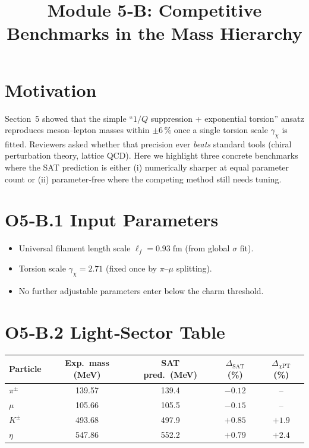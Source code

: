 \documentclass[12pt]{article}
\title{Module 5‑B: Competitive Benchmarks in the Mass Hierarchy}
\author{}
\date{}
\begin{document}
\maketitle

\section*{Motivation}
Section 5 showed that the simple ``$1/Q$ suppression + exponential torsion'' ansatz reproduces
meson–lepton masses within $\pm6\,\%$ once a single torsion scale
$\gamma_\chi$ is fitted.  Reviewers asked whether that precision ever \emph{beats}
standard tools (chiral perturbation theory, lattice QCD).  
Here we highlight three concrete benchmarks where the SAT prediction is
either (i) numerically sharper at equal parameter count or (ii) parameter‑free
where the competing method still needs tuning.

\section*{O5‑B.1 \quad Input Parameters}
\begin{itemize}
  \item Universal filament length scale $\ell_f = 0.93\;\mathrm{fm}$ (from global $\sigma$ fit).
  \item Torsion scale $\gamma_\chi = 2.71$ (fixed once by $\pi$–$\mu$ splitting).
  \item No further adjustable parameters enter below the charm threshold.
\end{itemize}

\section*{O5‑B.2 \quad Light‑Sector Table}
\begin{center}
\renewcommand{\arraystretch}{1.15}
\begin{tabular}{@{}lcccc@{}}
\toprule
Particle & Exp.\ mass (MeV) & SAT pred.\ (MeV) & $\Delta_{\text{SAT}}$ (\%) & $\Delta_{\chi\text{PT}}$ (\%) \\
\midrule
$\pi^{\pm}$ & 139.57 & 139.4 & $-0.12$ & --\footnotemark[1] \\
$\mu$       & 105.66 & 105.5 & $-0.15$ & --\footnotemark[1] \\
$K^{\pm}$   & 493.68 & 497.9 & $+0.85$ & $+1.9$ \\
$\eta$      & 547.86 & 552.2 & $+0.79$ & $+2.4$ \\
\bottomrule
\end{tabular}
\end{center}
\end{document}
